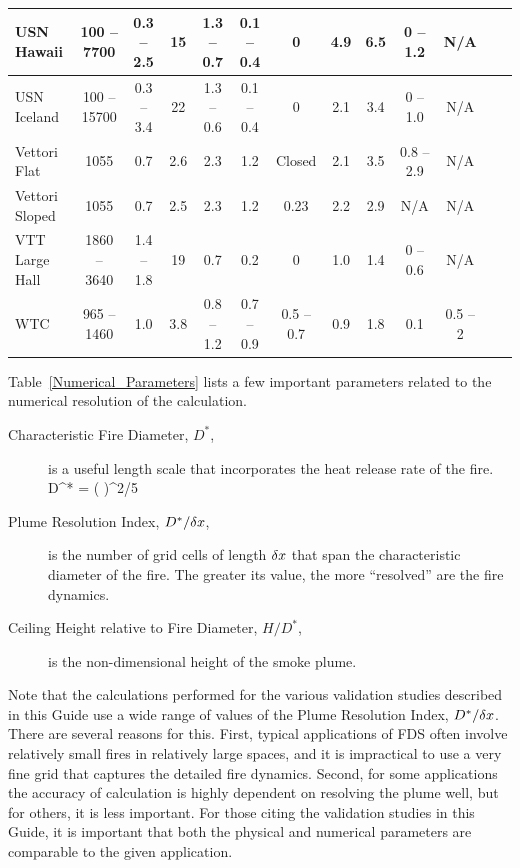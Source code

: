 \begin{table}
\begin{center}
\begin{tabular}{|l|c|c|c|c|c|c|c|c|c|c|c|c|}
USN Hawaii          & 100 -- 7700   & 0.3 -- 2.5    & 15    & 1.3 -- 0.7        & 0.1 -- 0.4    & 0             & 4.9       & 6.5       & 0 -- 1.2          & N/A               \\ \hline
USN Iceland         & 100 -- 15700  & 0.3 -- 3.4    & 22    & 1.3 -- 0.6        & 0.1 -- 0.4    & 0             & 2.1       & 3.4       & 0 -- 1.0          & N/A               \\ \hline
Vettori Flat        & 1055          & 0.7           & 2.6   & 2.3               & 1.2           & Closed        & 2.1       & 3.5       & 0.8 -- 2.9        & N/A               \\ \hline
Vettori Sloped      & 1055          & 0.7           & 2.5   & 2.3               & 1.2           & 0.23          & 2.2       & 2.9       & N/A               & N/A               \\ \hline
VTT Large Hall      & 1860 -- 3640  & 1.4 -- 1.8    & 19    & 0.7               & 0.2           & 0             & 1.0       & 1.4       & 0 -- 0.6          & N/A               \\ \hline
WTC                 & 965 -- 1460   & 1.0           & 3.8   & 0.8 -- 1.2        & 0.7 -- 0.9    & 0.5 -- 0.7    & 0.9       & 1.8       & 0.1               & 0.5 -- 2          \\ \hline
\end{tabular}
\end{center}
\label{Test_Parameters}
\nopagebreak
\end{table}


\noindent
Table~\ref{Numerical_Parameters} lists a few important parameters related to the numerical resolution of the calculation.
\begin{description}
\item[Characteristic Fire Diameter, $D^*$,] is a useful length scale that incorporates the heat release rate of the fire.
\be D^* = \left(  \right)^{2/5}  \ee
\item[Plume Resolution Index, $D^*/\delta x$,] is the number of grid cells of length $\delta x$ that span the characteristic diameter of the fire. The greater its value, the more
``resolved'' are the fire dynamics.
\item[Ceiling Height relative to Fire Diameter, $H/D^*$,] is the non-dimensional height of the smoke plume.
\end{description}
Note that the calculations performed for the various validation studies described in this Guide use a wide range of values of the Plume Resolution Index, $D^*/\delta x$.
There are several reasons for this. First,
typical applications of FDS often involve relatively small fires in relatively large spaces, and it is impractical to use a very fine grid that captures the detailed fire dynamics.
Second, for some applications the accuracy of calculation is highly dependent on resolving the plume well, but for others, it is less important. For those citing the validation
studies in this Guide, it is important that both the physical and numerical parameters are comparable to the given application.


